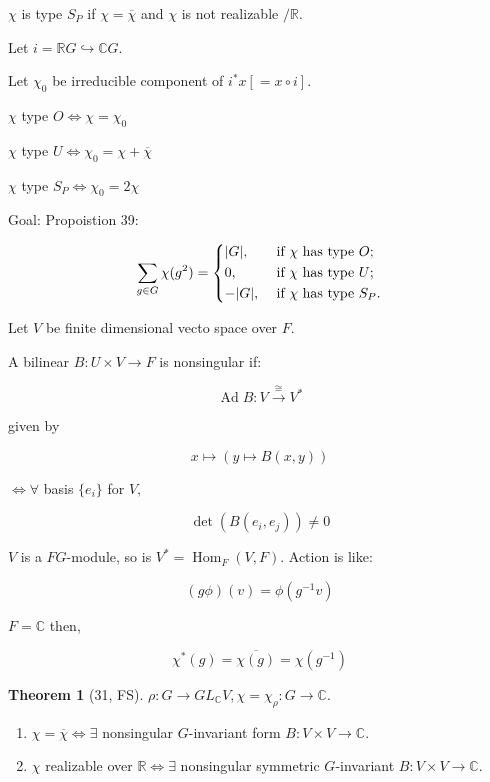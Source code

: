 \documentclass{article}
\theoremstyle{definition}
\newtheorem{theorem}{Theorem}
\begin{document}
\(\chi\) is type \(S_P\) if \(\chi =\overline{\chi} \) and \(\chi\) is not realizable \(/\mathbb{R}\).

Let \(i = \mathbb{R} G \hookrightarrow \mathbb{C} G\).

Let \(\chi_0\) be irreducible component of \(i^{\ast} x [=x \circ i]\).

\(\chi\) type \(O \iff \chi = \chi_0\) 

\(\chi\) type \(U \iff \chi_0 = \chi + \overline{\chi}\) 

\(\chi\) type \(S_P \iff \chi_0 = 2 \chi\) 

Goal: Propoistion 39:

\[
    \sum_{g\in G} \chi(g^2) = \begin{dcases}
        \vert G \vert , &\text{ if $\chi$ has type } O ;\\
        0, &\text{ if $\chi$ has type } U ;\\
        - \vert G \vert, &\text{ if $\chi$ has type } S_P.
    \end{dcases}
\]

Let \(V\) be finite dimensional vecto space over \(F\).

A bilinear \(B: U \times V \to F\) is nonsingular if:

\[
    \operatorname{Ad} B : V \overset{\cong}{\to} V^{\ast}
\]

given by

\[
    x \mapsto (y \mapsto B(x,y))
\]

\(\iff \forall\) basis \(\{ e_i \} \) for \(V,\) 

\[
    \det (B(e_i, e_j)) \neq 0
\]

\(V\) is a \(FG\)-module, so is \(V^{\ast} = \operatorname{Hom}_F (V,F)\). Action is like:

\[
    (g \phi)(v) = \phi (g ^{-1} v)
\]

\(F =\mathbb{C}\) then,

\[
    \chi^{\ast} (g) = \overline{\chi(g)} = \chi(g ^{-1})
\]

\begin{theorem}
    [31, FS]

    \(\rho: G \to GL_\mathbb{C} V, \chi = \chi_{\rho } : G \to \mathbb{C}\).

    \begin{enumerate}[label=\roman*)]
        \item \(\chi = \overline{\chi} \iff \exists\) nonsingular \(G\)-invariant form \(B: V \times V \to \mathbb{C}\).
        \item \(\chi\) realizable over \(\mathbb{R} \iff \exists\) nonsingular symmetric \(G\)-invariant \(B: V \times V \to \mathbb{C}\). 
    \end{enumerate} 
\end{theorem}
\end{document}
